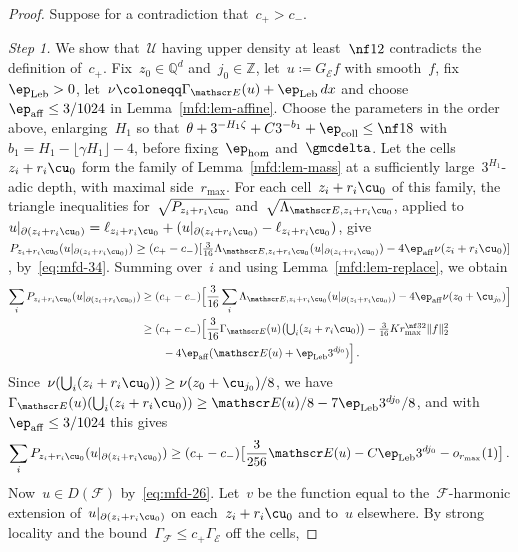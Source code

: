 \documentclass[11pt]{amsart}
\begin{document}
\begin{proof}
Suppose for a contradiction that~$c_+>c_-$.

\smallskip

\emph{Step 1.} We show that~$\mathcal U$ having upper density at least~$\nf12$ contradicts the definition of~$c_+$. Fix~$z_0\in\mathbb Q^d$ and~$j_0\in\mathbb Z$, let~$u\coloneqq G_{\mathscr E}f$ with smooth~$f$, fix~$\ep_{\rm Leb}>0$, let~$\nu\coloneqq\Gamma_{\mathscr E}(u)+\ep_{\rm Leb}\,dx$ and choose~$\ep_{\rm aff}\leq3/1024$ in Lemma~\ref{mfd:lem-affine}. Choose the parameters in the order above, enlarging~$H_1$ so that~$\theta+3^{-H_1\zeta}+C3^{-b_1}+\ep_{\rm coll}\leq\nf18$ with~$b_1=H_1-\lfloor\gamma H_1\rfloor-4$, before fixing~$\ep_{\rm hom}$ and~$\gmcdelta$. Let the cells~$z_i+r_i\cu_0$ form the family of Lemma~\ref{mfd:lem-mass} at a sufficiently large~$3^{H_1}$-adic depth, with maximal side~$r_{\max}$. For each cell~$z_i+r_i\cu_0$ of this family, the triangle inequalities for~$\sqrt{P_{z_i+r_i\cu_0}}$ and~$\sqrt{\Lambda_{\mathscr E,z_i+r_i\cu_0}}$, applied to~$u|_{\partial(z_i+r_i\cu_0)}=\ell_{z_i+r_i\cu_0}+(u|_{\partial(z_i+r_i\cu_0)}-\ell_{z_i+r_i\cu_0})$, give~$P_{z_i+r_i\cu_0}(u|_{\partial(z_i+r_i\cu_0)})\geq(c_+-c_-)[\frac{3}{16}\Lambda_{\mathscr E,z_i+r_i\cu_0}(u|_{\partial(z_i+r_i\cu_0)})-4\ep_{\rm aff}\nu(z_i+r_i\cu_0)]$, by~\eqref{eq:mfd-34}. Summing over~$i$ and using Lemma~\ref{mfd:lem-replace}, we obtain
\begin{align*}
	\sum_iP_{z_i+r_i\cu_0}(u|_{\partial(z_i+r_i\cu_0)})
	&\geq(c_+-c_-)\Bigl[\frac{3}{16}\sum_i\Lambda_{\mathscr E,z_i+r_i\cu_0}(u|_{\partial(z_i+r_i\cu_0)})-4\ep_{\rm aff}\nu(z_0+\cu_{j_0})\Bigr]\\
	&\geq(c_+-c_-)\Bigl[\frac{3}{16}\Gamma_{\mathscr E}(u)\bigl(\textstyle\bigcup_i(z_i+r_i\cu_0)\bigr)
	-\frac{3}{16}Kr_{\max}^{\nf32}\|f\|_2^2\\
	&\qquad-4\ep_{\rm aff}(\mathscr E(u)+\ep_{\rm Leb}3^{dj_0})\Bigr]\,.
\end{align*}
Since~$\nu(\bigcup_i(z_i+r_i\cu_0))\geq\nu(z_0+\cu_{j_0})/8$, we have~$\Gamma_{\mathscr E}(u)(\bigcup_i(z_i+r_i\cu_0))\geq \mathscr E(u)/8-7\ep_{\rm Leb}3^{dj_0}/8$, and with~$\ep_{\rm aff}\leq3/1024$ this gives
\begin{equation*}
	\sum_iP_{z_i+r_i\cu_0}(u|_{\partial(z_i+r_i\cu_0)})\geq(c_+-c_-)\bigl[\frac{3}{256}\mathscr E(u)-C\ep_{\rm Leb}3^{dj_0}-o_{r_{\max}}(1)\bigr]\,.
\end{equation*}
Now~$u\in D(\mathscr F)$ by~\eqref{eq:mfd-26}. Let~$v$ be the function equal to the~$\mathscr F$-harmonic extension of~$u|_{\partial(z_i+r_i\cu_0)}$ on each~$z_i+r_i\cu_0$ and to~$u$ elsewhere. By strong locality and the bound~$\Gamma_{\mathscr F}\leq c_+\Gamma_{\mathscr E}$ off the cells,

\end{proof}
\end{document}
